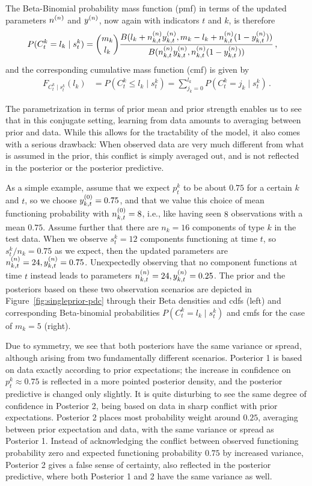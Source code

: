 \documentclass[12pt, a4paper]{elsarticle}
\newcommand{\ptk}{p^k_t}
\begin{document}
The Beta-Binomial probability mass function (pmf) in terms of the updated parameters $n^{(n)}$ and $y^{(n)}$,
now again with indicators $t$ and $k$,
is therefore
\begin{align}
P(C^k_t = l_k \mid s^k_t) &= {m_k \choose l_k} \frac{B(l_k + n^{(n)}_{k,t}y^{(n)}_{k,t}, m_k - l_k + n^{(n)}_{k,t}(1-y^{(n)}_{k,t}))}
                                                    {B(n^{(n)}_{k,t}y^{(n)}_{k,t}, n^{(n)}_{k,t}(1-y^{(n)}_{k,t}))} \,,
\label{eq:postpredCny}
\end{align}
and the corresponding cumulative mass function (cmf) is given by
\begin{align}
F_{C^k_t\mid s^k_t}(l_k) &= P(C^k_t \le l_k \mid s^k_t) = \sum_{j_k=0}^{l_k} P(C^k_t = j_k \mid s^k_t)\,.
\label{eq:postpredCnycmf}
\end{align}


The parametrization in terms of prior mean and prior strength
enables us to see that in this conjugate setting,
learning from data amounts to averaging between prior and data.
While this allows for the tractability of the model,
it also comes with a serious drawback:
When observed data are very much different from what is assumed in the prior,
this conflict is simply averaged out,
and is not reflected in the posterior or the posterior predictive.

As a simple example, assume that we expect $\ptk$ to be about $0.75$ for a certain $k$ and $t$,
so we choose $y^{(0)}_{k,t} = 0.75$,
and that we value this choice of mean functioning probability with $n^{(0)}_{k,t} = 8$,
i.e., like having seen $8$ observations with a mean $0.75$.
Assume further that there are $n_k = 16$ components of type $k$ in the test data.
When we observe $s^k_t = 12$ components functioning at time $t$,
so $s^k_t/n_k = 0.75$ as we expect,
then the updated parameters are $n^{(n)}_{k,t} = 24, y^{(n)}_{k,t}=0.75$.
Unexpectedly observing that no component functions at time $t$ instead
leads to parameters $n^{(n)}_{k,t} = 24, y^{(n)}_{k,t}=0.25$.
The prior and the posteriors based on these two observation scenarios
are depicted in Figure~\ref{fig:singleprior-pdc}
through their Beta densities and cdfs (left)
and corresponding Beta-binomial probabilities $P(C^k_t = l_k\mid s^k_t)$ and cmfs
for the case of $m_k = 5$ (right).

Due to symmetry, we see that both posteriors have the same variance or spread,
although arising from two fundamentally different scenarios.
Posterior 1 is based on data exactly according to prior expectations;
the increase in confidence on $\ptk \approx 0.75$
is reflected in a more pointed posterior density,
and the posterior predictive is changed only slightly.
It is quite disturbing to see the same degree of confidence in Posterior 2,
being based on data in sharp conflict with prior expectations.
Posterior 2 places most probability weight around $0.25$,
averaging between prior expectation and data,
with the same variance or spread as Posterior 1.
Instead of acknowledging the conflict between observed functioning probability zero
and expected functioning probability $0.75$ by increased variance,
Posterior 2 gives a false sense of certainty,
also reflected in the posterior predictive,
where both Posterior 1 and 2 have the same variance as well.
\end{document}
